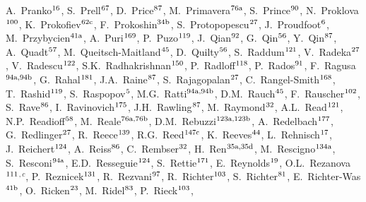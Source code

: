 \begin{flushleft}
A.~Pranko$^\textrm{\scriptsize 16}$,
S.~Prell$^\textrm{\scriptsize 67}$,
D.~Price$^\textrm{\scriptsize 87}$,
M.~Primavera$^\textrm{\scriptsize 76a}$,
S.~Prince$^\textrm{\scriptsize 90}$,
N.~Proklova$^\textrm{\scriptsize 100}$,
K.~Prokofiev$^\textrm{\scriptsize 62c}$,
F.~Prokoshin$^\textrm{\scriptsize 34b}$,
S.~Protopopescu$^\textrm{\scriptsize 27}$,
J.~Proudfoot$^\textrm{\scriptsize 6}$,
M.~Przybycien$^\textrm{\scriptsize 41a}$,
A.~Puri$^\textrm{\scriptsize 169}$,
P.~Puzo$^\textrm{\scriptsize 119}$,
J.~Qian$^\textrm{\scriptsize 92}$,
G.~Qin$^\textrm{\scriptsize 56}$,
Y.~Qin$^\textrm{\scriptsize 87}$,
A.~Quadt$^\textrm{\scriptsize 57}$,
M.~Queitsch-Maitland$^\textrm{\scriptsize 45}$,
D.~Quilty$^\textrm{\scriptsize 56}$,
S.~Raddum$^\textrm{\scriptsize 121}$,
V.~Radeka$^\textrm{\scriptsize 27}$,
V.~Radescu$^\textrm{\scriptsize 122}$,
S.K.~Radhakrishnan$^\textrm{\scriptsize 150}$,
P.~Radloff$^\textrm{\scriptsize 118}$,
P.~Rados$^\textrm{\scriptsize 91}$,
F.~Ragusa$^\textrm{\scriptsize 94a,94b}$,
G.~Rahal$^\textrm{\scriptsize 181}$,
J.A.~Raine$^\textrm{\scriptsize 87}$,
S.~Rajagopalan$^\textrm{\scriptsize 27}$,
C.~Rangel-Smith$^\textrm{\scriptsize 168}$,
T.~Rashid$^\textrm{\scriptsize 119}$,
S.~Raspopov$^\textrm{\scriptsize 5}$,
M.G.~Ratti$^\textrm{\scriptsize 94a,94b}$,
D.M.~Rauch$^\textrm{\scriptsize 45}$,
F.~Rauscher$^\textrm{\scriptsize 102}$,
S.~Rave$^\textrm{\scriptsize 86}$,
I.~Ravinovich$^\textrm{\scriptsize 175}$,
J.H.~Rawling$^\textrm{\scriptsize 87}$,
M.~Raymond$^\textrm{\scriptsize 32}$,
A.L.~Read$^\textrm{\scriptsize 121}$,
N.P.~Readioff$^\textrm{\scriptsize 58}$,
M.~Reale$^\textrm{\scriptsize 76a,76b}$,
D.M.~Rebuzzi$^\textrm{\scriptsize 123a,123b}$,
A.~Redelbach$^\textrm{\scriptsize 177}$,
G.~Redlinger$^\textrm{\scriptsize 27}$,
R.~Reece$^\textrm{\scriptsize 139}$,
R.G.~Reed$^\textrm{\scriptsize 147c}$,
K.~Reeves$^\textrm{\scriptsize 44}$,
L.~Rehnisch$^\textrm{\scriptsize 17}$,
J.~Reichert$^\textrm{\scriptsize 124}$,
A.~Reiss$^\textrm{\scriptsize 86}$,
C.~Rembser$^\textrm{\scriptsize 32}$,
H.~Ren$^\textrm{\scriptsize 35a,35d}$,
M.~Rescigno$^\textrm{\scriptsize 134a}$,
S.~Resconi$^\textrm{\scriptsize 94a}$,
E.D.~Resseguie$^\textrm{\scriptsize 124}$,
S.~Rettie$^\textrm{\scriptsize 171}$,
E.~Reynolds$^\textrm{\scriptsize 19}$,
O.L.~Rezanova$^\textrm{\scriptsize 111}$$^{,c}$,
P.~Reznicek$^\textrm{\scriptsize 131}$,
R.~Rezvani$^\textrm{\scriptsize 97}$,
R.~Richter$^\textrm{\scriptsize 103}$,
S.~Richter$^\textrm{\scriptsize 81}$,
E.~Richter-Was$^\textrm{\scriptsize 41b}$,
O.~Ricken$^\textrm{\scriptsize 23}$,
M.~Ridel$^\textrm{\scriptsize 83}$,
P.~Rieck$^\textrm{\scriptsize 103}$,
$$
\end{flushleft}
